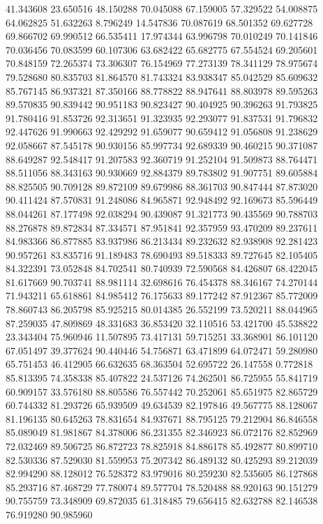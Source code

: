 41.343608
23.650516
48.150288
70.045088
67.159005
57.329522
54.008875
64.062825
51.632263
8.796249
14.547836
70.087619
68.501352
69.627728
69.866702
69.990512
66.535411
17.974344
63.996798
70.010249
70.141846
70.036456
70.083599
60.107306
63.682422
65.682775
67.554524
69.205601
70.848159
72.265374
73.306307
76.154969
77.273139
78.341129
78.975674
79.528680
80.835703
81.864570
81.743324
83.938347
85.042529
85.609632
85.767145
86.937321
87.350166
88.778822
88.947641
88.803978
89.595263
89.570835
90.839442
90.951183
90.823427
90.404925
90.396263
91.793825
91.780416
91.853726
92.313651
91.323935
92.293077
91.837531
91.796832
92.447626
91.990663
92.429292
91.659077
90.659412
91.056808
91.238629
92.058667
87.545178
90.930156
85.997734
92.689339
90.460215
90.371087
88.649287
92.548417
91.207583
92.360719
91.252104
91.509873
88.764471
88.511056
88.343163
90.930669
92.884379
89.783802
91.907751
89.605884
88.825505
90.709128
89.872109
89.679986
88.361703
90.847444
87.873020
90.411424
87.570831
91.248086
84.965871
92.948492
92.169673
85.596449
88.044261
87.177498
92.038294
90.439087
91.321773
90.435569
90.788703
88.276878
89.872834
87.334571
87.951841
92.357959
93.470209
89.237611
84.983366
86.877885
83.937986
86.213434
89.232632
82.938908
92.281423
90.957261
83.835716
91.189483
78.690493
89.518333
89.727645
82.105405
84.322391
73.052848
84.702541
80.740939
72.590568
84.426807
68.422045
81.617669
90.703741
88.981114
32.698616
76.454378
88.346167
74.270144
71.943211
65.618861
84.985412
76.175633
89.177242
87.912367
85.772009
78.860743
86.205798
85.925215
80.014385
26.552199
73.520211
88.044965
87.259035
47.809869
48.331683
36.853420
32.110516
53.421700
45.538822
23.343404
75.960946
11.507895
73.417131
59.715251
33.368901
86.101120
67.051497
39.377624
90.440446
54.756871
63.471899
64.072471
59.280980
65.751453
46.412905
66.632635
68.363504
52.695722
26.147558
0.772818
85.813395
74.358338
85.407822
24.537126
74.262501
86.725955
55.841719
60.909157
33.576180
88.805586
76.557442
70.252061
85.651975
82.865729
60.744332
81.293726
65.939509
49.634539
82.197846
49.567775
88.128067
81.196135
80.645263
78.831654
84.937671
88.795125
79.212904
86.846558
85.089049
81.981867
84.378006
86.231355
82.346923
86.072176
82.852969
72.032469
89.506725
86.872723
78.825918
84.886178
85.492877
80.899710
82.530336
87.529030
81.559953
75.207342
86.489132
80.425293
89.212039
82.994290
88.128012
76.528372
83.979016
80.259230
82.535605
86.127868
85.293716
87.468729
77.780074
89.577704
78.520488
88.920163
90.151279
90.755759
73.348909
69.872035
61.318485
79.656415
82.632788
82.146538
76.919280
90.985960
